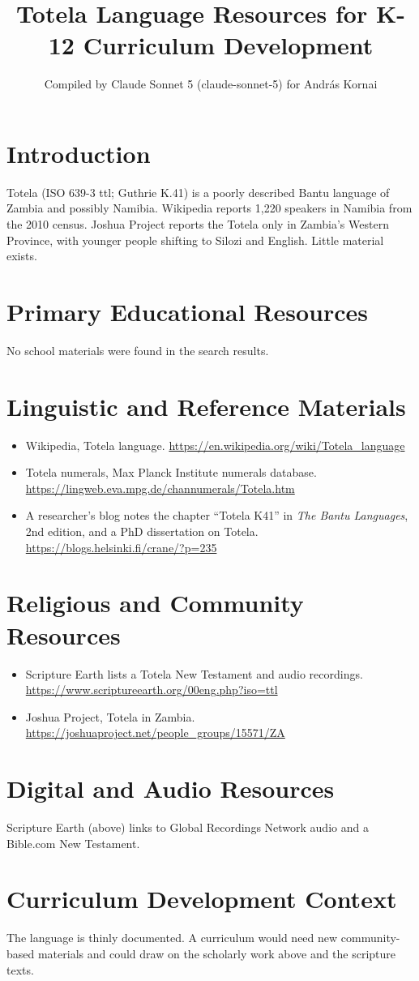 \documentclass[12pt]{article}
\title{Totela Language Resources for K-12 Curriculum Development}
\author{Compiled by Claude Sonnet 5 (claude-sonnet-5) for Andr\'as Kornai}
\date{}
\begin{document}
\maketitle
\section{Introduction}
Totela (ISO 639-3 ttl; Guthrie K.41) is a poorly described Bantu language of Zambia and possibly Namibia. Wikipedia reports 1,220 speakers in Namibia from the 2010 census. Joshua Project reports the Totela only in Zambia's Western Province, with younger people shifting to Silozi and English. Little material exists.
\section{Primary Educational Resources}
No school materials were found in the search results.
\section{Linguistic and Reference Materials}
\begin{itemize}
\item Wikipedia, Totela language. \url{https://en.wikipedia.org/wiki/Totela_language}
\item Totela numerals, Max Planck Institute numerals database. \url{https://lingweb.eva.mpg.de/channumerals/Totela.htm}
\item A researcher's blog notes the chapter ``Totela K41'' in \emph{The Bantu Languages}, 2nd edition, and a PhD dissertation on Totela. \url{https://blogs.helsinki.fi/crane/?p=235}
\end{itemize}
\section{Religious and Community Resources}
\begin{itemize}
\item Scripture Earth lists a Totela New Testament and audio recordings. \url{https://www.scriptureearth.org/00eng.php?iso=ttl}
\item Joshua Project, Totela in Zambia. \url{https://joshuaproject.net/people_groups/15571/ZA}
\end{itemize}
\section{Digital and Audio Resources}
Scripture Earth (above) links to Global Recordings Network audio and a Bible.com New Testament.
\section{Curriculum Development Context}
The language is thinly documented. A curriculum would need new community-based materials and could draw on the scholarly work above and the scripture texts.
\end{document}

